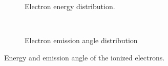 \begin{figure}[!ht]
	\begin{subfigure}[t]{0.5\textwidth}
		
		\caption{Electron energy distribution.}
		\label{}
	\end{subfigure}
	~
	\begin{subfigure}[t]{0.5\textwidth}
		
		\caption{Electron emission angle distribution}
		\label{}
	\end{subfigure}
	\caption[Energy and emission angle of the ionized electrons]{Energy and emission angle of the ionized electrons.}
	\label{chap3:garfieldangle}
\end{figure}
